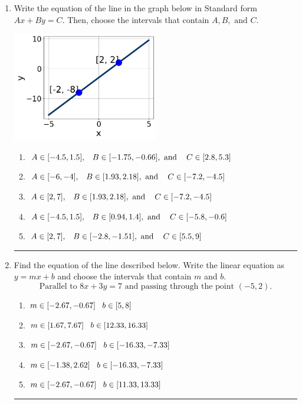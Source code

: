 \documentclass[14pt]{extbook}
\newcommand{\litem}[1]{\item#1\hspace*{-1cm}\rule{\textwidth}{0.4pt}}
\begin{document}
\begin{enumerate}
\litem{
Write the equation of the line in the graph below in Standard form $Ax+By=C$. Then, choose the intervals that contain $A, B, \text{ and } C$.
\begin{center}
    \includegraphics[width=0.5\textwidth]{../Figures/linearGraphToStandardC.png}
\end{center}
\begin{enumerate}[label=\Alph*.]
\item \( A \in [-4.5, 1.5], \hspace{3mm} B \in [-1.75, -0.66], \text{ and } \hspace{3mm} C \in [2.8, 5.3] \)
\item \( A \in [-6, -4], \hspace{3mm} B \in [1.93, 2.18], \text{ and } \hspace{3mm} C \in [-7.2, -4.5] \)
\item \( A \in [2, 7], \hspace{3mm} B \in [1.93, 2.18], \text{ and } \hspace{3mm} C \in [-7.2, -4.5] \)
\item \( A \in [-4.5, 1.5], \hspace{3mm} B \in [0.94, 1.4], \text{ and } \hspace{3mm} C \in [-5.8, -0.6] \)
\item \( A \in [2, 7], \hspace{3mm} B \in [-2.8, -1.51], \text{ and } \hspace{3mm} C \in [5.5, 9] \)

\end{enumerate} }
\litem{
Find the equation of the line described below. Write the linear equation as $ y=mx+b $ and choose the intervals that contain $m$ and $b$.\[ \text{Parallel to } 8 x + 3 y = 7 \text{ and passing through the point } (-5, 2). \]\begin{enumerate}[label=\Alph*.]
\item \( m \in [-2.67, -0.67] \hspace*{3mm} b \in [5, 8] \)
\item \( m \in [1.67, 7.67] \hspace*{3mm} b \in [12.33, 16.33] \)
\item \( m \in [-2.67, -0.67] \hspace*{3mm} b \in [-16.33, -7.33] \)
\item \( m \in [-1.38, 2.62] \hspace*{3mm} b \in [-16.33, -7.33] \)
\item \( m \in [-2.67, -0.67] \hspace*{3mm} b \in [11.33, 13.33] \)


\end{enumerate}}
\end{enumerate}
\end{document}
